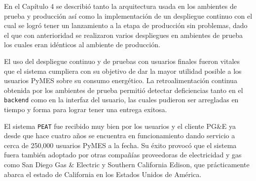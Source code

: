 En el Capítulo 4 se describió tanto la arquitectura usada en los ambientes de
prueba y producción así como la implementación de un despliegue continuo con el
cual se logró tener un lanzamiento a la etapa de producción sin problemas, dado el
que con anterioridad se realizaron varios despliegues en ambientes de prueba
los cuales eran idénticos al ambiente de producción.

El uso del despliegue continuo y de pruebas con usuarios finales fueron vitales
que el sistema cumpliera con su objetivo de dar la mayor utilidad posible
a los usuarios PyMES sobre su consumo energético. La retroalimentación continua
obtenida por los ambientes de prueba permitió detectar deficiencias tanto en el
\texttt{backend} como en la interfaz del usuario, las cuales pudieron ser arregladas
en tiempo y forma para lograr tener una entrega exitosa.

El sistema \texttt{PEAT} fue recibido muy bien por los usuarios y el cliente PG\&E
ya desde que hace cuatro años se encuentra en funcionamiento dando servicio a cerca
de 250,000 usuarios PyMES a la fecha\cite{30_pge_annual_report}. Su éxito provocó que
el sistema fuera también adoptado por otras compañías proveedoras de electricidad y
gas como San Diego Gas \& Electric y Southern California Edison, que prácticamente
abarca el estado de California en los Estados Unidos de América.
